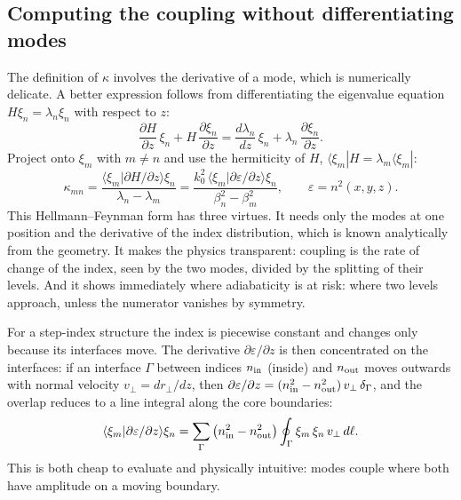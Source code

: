 \documentclass[11pt,a4paper]{article}
\newcommand{\bra}[1]{\langle #1|}
\newcommand{\braket}[2]{\langle #1|#2\rangle}
\begin{document}
\subsection{Computing the coupling without differentiating modes}
The definition of $\kappa$ involves the derivative of a mode, which is numerically delicate. A better expression follows from differentiating the eigenvalue equation $H\xi_n = \lambda_n \xi_n$ with respect to $z$:
\begin{equation}
\frac{\partial H}{\partial z}\,\xi_n + H\,\frac{\partial \xi_n}{\partial z} = \frac{d\lambda_n}{dz}\,\xi_n + \lambda_n\,\frac{\partial \xi_n}{\partial z}.
\label{eq:diff_eigen}
\end{equation}
Project onto $\xi_m$ with $m \neq n$ and use the hermiticity of $H$, $\bra{\xi_m}H = \lambda_m\bra{\xi_m}$:
\begin{equation}
\kappa_{mn} = \frac{\braket{\xi_m}{\partial H/\partial z}{\xi_n}}{\lambda_n - \lambda_m}
= \frac{k_0^2\, \braket{\xi_m}{\partial \varepsilon/\partial z}{\xi_n}}{\beta_n^2 - \beta_m^2},
\qquad
\varepsilon = n^2(x,y,z).
\label{eq:hellmann}
\end{equation}
This Hellmann--Feynman form has three virtues. It needs only the modes at one position and the derivative of the index distribution, which is known analytically from the geometry. It makes the physics transparent: coupling is the rate of change of the index, seen by the two modes, divided by the splitting of their levels. And it shows immediately where adiabaticity is at risk: where two levels approach, unless the numerator vanishes by symmetry.

For a step-index structure the index is piecewise constant and changes only because its interfaces move. The derivative $\partial\varepsilon/\partial z$ is then concentrated on the interfaces: if an interface $\Gamma$ between indices $n_{\rm in}$ (inside) and $n_{\rm out}$ moves outwards with normal velocity $v_\perp = dr_\perp/dz$, then $\partial\varepsilon/\partial z = (n_{\rm in}^2 - n_{\rm out}^2)\, v_\perp\, \delta_\Gamma$, and the overlap reduces to a line integral along the core boundaries:
\begin{equation}
\braket{\xi_m}{\partial\varepsilon/\partial z}{\xi_n}
= \sum_\Gamma \left( n_{\rm in}^2 - n_{\rm out}^2 \right) \oint_\Gamma \xi_m\, \xi_n\, v_\perp\, d\ell.
\label{eq:interface}
\end{equation}
This is both cheap to evaluate and physically intuitive: modes couple where both have amplitude on a moving boundary.
\end{document}
